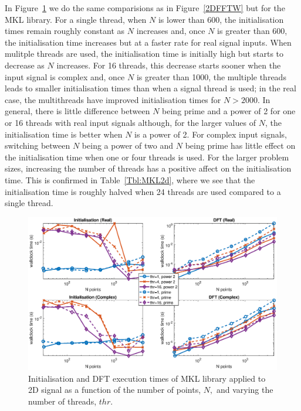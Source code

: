 \documentclass[a4paper]{article}
\begin{document}
In Figure~\ref{2DMKL} we do the same comparisions as in
Figure~\ref{2DFFTW} but for the MKL library. For a single thread, when
$N$ is lower than 600, the initialisation times remain roughly
constant as $N$ increases and, once $N$ is greater than 600, the
initialisation time increases but at a faster rate for real signal
inputs. When mulitple threads are used, the initialisation time is
initially high but starts to decrease as $N$ increases. For 16
threads, this decrease starts sooner when the input signal is complex
and, once $N$ is greater than 1000, the multiple threads leads to
smaller initialisation times than when a signal thread is used; in the
real case, the multithreads have improved initialisation times for
$N>2000.$ In general, there is little difference between $N$ being
prime and a power of 2 for one or 16 threads with real input signals
although, for the larger values of $N$, the initialisation time is
better when $N$ is a power of 2. For complex input signals, switching
between $N$ being a power of two and $N$ being prime has little effect
on the initialisation time when one or four threads is used. For the
larger problem sizes, increasing the number of threads has a positive
affect on the initialisation time.  This is confirmed in
Table~\ref{Tbl:MKL2d}, where we see that the initialisation time is
roughly halved when 24 threads are used compared to a single thread.



\begin{figure}[htb]
    \centering
    \includegraphics[width=0.9\linewidth]{../results/mkl_2d_thr.eps}
  \caption{Initialisation and DFT execution times of MKL library applied to 2D signal as a function of the
    number of points, $N,$ and varying the number of threads, $thr.$ }
  \label{2DMKL}
\end{figure}
\end{document}
